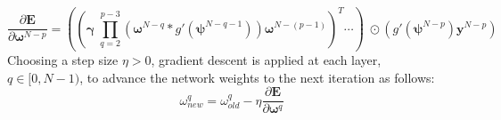 \documentclass{article}
\begin{document}
%
\begin{equation} \label{eq:derive_du_nm5_matrix_delta}
\frac{\partial \bm{E}}{\partial \bm{\omega}^{N-p}} =
\left(
\left(
\bm{\gamma} \;
\prod_{q=2}^{p-3}
\left( \bm{\omega}^{N-q} * g' \left( \bm{\psi}^{N-q-1} \right) \right)
\bm{\omega}^{N-(p-1)}
\right)^T
\cdots
\right) \;
\odot
\left(
g' \left( \bm{\psi}^{N-p} \right)
\bm{y}^{N-p}
\right)
\end{equation}
%
Choosing a step size $\eta > 0$, gradient descent is applied at each layer, $q \in [0, N-1)$, to advance the network weights to the next iteration as follows:
%
\begin{equation} \label{eq:end_weights}
\omega_{new}^q = \omega_{old}^q - \eta
\frac{\partial \bm{E}}{\partial \bm{\omega}^q}
\end{equation}
%
\end{document}
